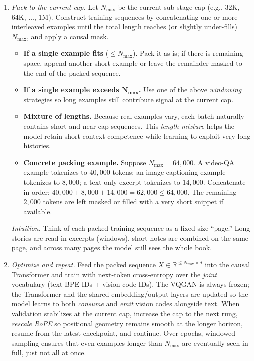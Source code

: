 \begin{enrichment}
\begin{enrichment}
\begin{enumerate}
            \item \textit{Pack to the current cap.} Let \(N_{\max}\) be the current sub-stage cap (e.g., \(32\mathrm{K}\), \(64\mathrm{K}\), \(\ldots\), \(1\mathrm{M}\)). Construct training sequences by concatenating one or more interleaved examples until the total length reaches (or slightly under-fills) \(N_{\max}\), and apply a causal mask.
            \begin{itemize}
                \item \textbf{If a single example fits} (\(\leq N_{\max}\)). Pack it as is; if there is remaining space, append another short example or leave the remainder masked to the end of the packed sequence.
                \item \textbf{If a single example exceeds \(\boldsymbol{N_{\max}}\).} Use one of the above \emph{windowing} strategies so long examples still contribute signal at the current cap.
                \item \textbf{Mixture of lengths.} Because real examples vary, each batch naturally contains short and near-cap sequences. This \emph{length mixture} helps the model retain short-context competence while learning to exploit very long histories.
                \item \textbf{Concrete packing example.} Suppose \(N_{\max}=64{,}000\). A video-QA example tokenizes to \(40{,}000\) tokens; an image-captioning example tokenizes to \(8{,}000\); a text-only excerpt tokenizes to \(14{,}000\). Concatenate in order: \(40{,}000 + 8{,}000 + 14{,}000 = 62{,}000 \leq 64{,}000\). The remaining \(2{,}000\) tokens are left masked or filled with a very short snippet if available.
            \end{itemize}
            \emph{Intuition.} Think of each packed training sequence as a fixed-size ``page.'' Long stories are read in excerpts (windows), short notes are combined on the same page, and across many pages the model still sees the whole book.
            
            \newpage
            
            \item \textit{Optimize and repeat.} Feed the packed sequence \(X\in\mathbb{R}^{\leq N_{\max}\times d}\) into the causal Transformer and train with next-token cross-entropy over the \emph{joint} vocabulary (text BPE IDs + vision code IDs). The VQGAN is always frozen; the Transformer and the shared embedding/output layers are updated so the model learns to both \emph{consume} and \emph{emit} vision codes alongside text. When validation stabilizes at the current cap, increase the cap to the next rung, \emph{rescale RoPE} so positional geometry remains smooth at the longer horizon, resume from the latest checkpoint, and continue. Over epochs, windowed sampling ensures that even examples longer than \(N_{\max}\) are eventually seen in full, just not all at once.
        \end{enumerate}
        

\end{enrichment}
\end{enrichment}
